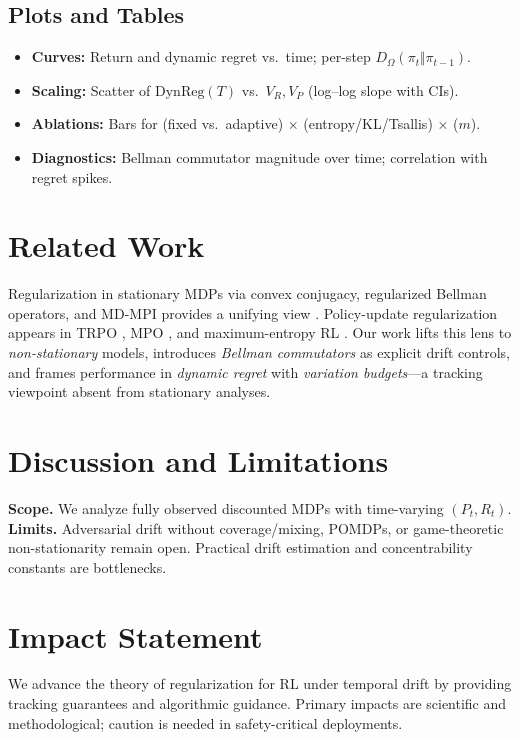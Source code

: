 \documentclass{article}
\theoremstyle{plain}
\theoremstyle{definition}
\theoremstyle{remark}
\newcommand{\1}{\mathbbm{1}}
\begin{document}
\subsection{Plots and Tables}
\label{subsec:plots}
\begin{itemize}[leftmargin=*,nosep]
\item \textbf{Curves:} Return and dynamic regret vs.\ time; per-step $D_\Omega(\pi_t\Vert\pi_{t-1})$.
\item \textbf{Scaling:} Scatter of $\mathrm{DynReg}(T)$ vs.\ $V_R,V_P$ (log--log slope with CIs).
\item \textbf{Ablations:} Bars for (fixed vs.\ adaptive) $\times$ (entropy/KL/Tsallis) $\times$ ($m$).
\item \textbf{Diagnostics:} Bellman commutator magnitude over time; correlation with regret spikes.
\end{itemize}


\section{Related Work}
Regularization in stationary MDPs via convex conjugacy, regularized Bellman operators, and MD-MPI provides a unifying view \cite{geist2019theory}. Policy-update regularization appears in TRPO \cite{schulman2015trpo}, MPO \cite{abdolmaleki2018mpo}, and maximum-entropy RL \cite{haarnoja2018sac}. Our work lifts this lens to \emph{non-stationary} models, introduces \emph{Bellman commutators} as explicit drift controls, and frames performance in \emph{dynamic regret} with \emph{variation budgets}—a tracking viewpoint absent from stationary analyses.

\section{Discussion and Limitations}
\textbf{Scope.} We analyze fully observed discounted MDPs with time-varying $(P_t,R_t)$. \textbf{Limits.} Adversarial drift without coverage/mixing, POMDPs, or game-theoretic non-stationarity remain open. Practical drift estimation and concentrability constants are bottlenecks. 

\section*{Impact Statement}
We advance the theory of regularization for RL under temporal drift by providing tracking guarantees and algorithmic guidance. Primary impacts are scientific and methodological; caution is needed in safety-critical deployments.




\end{document}
